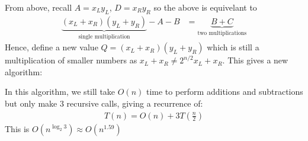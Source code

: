 \documentclass[14pt]{extarticle}
\begin{document}
    From above, recall $A = x_Ly_L$, $D = x_Ry_R$ so the above is equivelant
    to
    \begin{align*}
        \underbrace{(x_L + x_R)(y_L + y_R)}_{\text{single multiplication}} 
        - A - B &= \underbrace{B + C}_{\text{two multiplications}}
    \end{align*}
    Hence, define a new value $Q = (x_L + x_R)(y_L + y_R)$ which is still
    a multiplication of smaller numbers as $x_L + x_R \neq 2^{n/2} x_L + x_R$.
    This gives a new algorithm:
    \begin{algorithm}
    \end{algorithm}

    In this algorithm, we still take $O(n)$ time to perform additions and
    subtractions but only make $3$ recursive calls, giving a recurrence of:
    \begin{align*}
        T(n) = O(n) + 3T\left(\frac{n}{2}\right)
    \end{align*}
    This is $O\left(n^{\log_2 3}\right) \approx O\left(n^{1.59}\right)$

   


\end{document}
